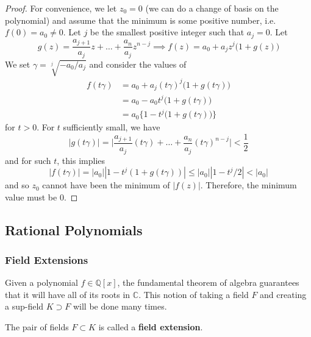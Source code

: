 \begin{proof}
    For convenience, we let $z_0 = 0$ (we can do a change of basis on the polynomial) and assume that the minimum is some positive number, i.e. $f(0) = a_0 \neq 0$. Let $j$ be the smallest positive integer such that $a_j = 0$. Let 
    \begin{equation}
      g(z) = \frac{a_{j+1}}{a_j} z + \ldots + \frac{a_n}{a_j} z^{n-j} \implies f(z) = a_0 + a_j z^j \big( 1 + g(z) \big) 
    \end{equation}
    We set $\gamma = \sqrt[j]{-a_0/a_j}$ and consider the values of 
    \begin{align}
      f(t \gamma) & = a_0 + a_j (t\gamma)^j \big( 1 + g(t\gamma) \big) \\
                  & = a_0 - a_0 t^j \big(1 + g(t \gamma) \big) \\
                  & = a_0 \big\{ 1 - t^j \big(1 + g(t \gamma) \big) \big\}
    \end{align} 
    for $t > 0$. For $t$ sufficiently small, we have 
    \begin{equation}
      |g(t \gamma)| = \bigg| \frac{a_{j+1}}{a_j} (t \gamma) + \ldots + \frac{a_n}{a_j} (t \gamma)^{n-j} \bigg| < \frac{1}{2} 
    \end{equation}
    and for such $t$, this implies 
    \begin{equation}
      |f(t \gamma)| = |a_0| |1 - t^j (1 + g(t \gamma))| \leq |a_0| |1 - t^j/2| < |a_0|
    \end{equation}
    and so $z_0$ cannot have been the minimum of $|f(z)|$. Therefore, the minimum value must be $0$.  
  \end{proof}

\subsection{Rational Polynomials} 

  \subsubsection{Field Extensions}

    Given a polynomial $f \in \mathbb{Q}[x]$, the fundamental theorem of algebra guarantees that it will have all of its roots in $\mathbb{C}$. This notion of taking a field $F$ and creating a sup-field $K \supset F$ will be done many times. 

    \begin{definition}
      The pair of fields $F \subset K$ is called a \textbf{field extension}. 
    \end{definition}

